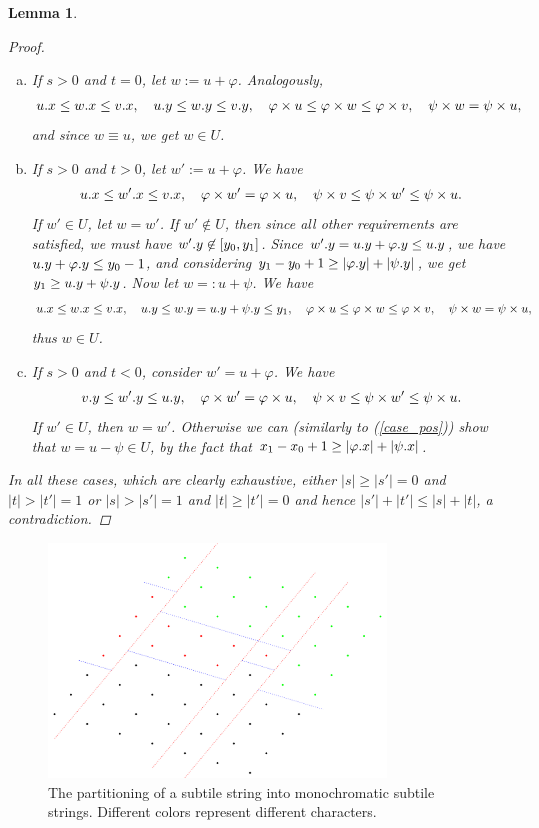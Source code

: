\documentclass[11pt, letterpaper]{article}
\theoremstyle{plain}
\newtheorem{lemma}{Lemma}
\theoremstyle{definition}
\theoremstyle{remark}
\renewcommand{\phi}{\varphi}
\newcommand{\eq}[1]{\begin{align*} #1 \end{align*}}
\begin{document}
\begin{lemma}
\begin{proof}
\begin{enumerate}[(a)]
			\item If $s > 0$ and $t = 0$, let $w := u + \phi$. Analogously, 
				\eq{
					\x{u} \le \x{w} \le \x{v}, \quad \y{u} \le \y{w} \le \y{v}, \quad \h{u} \le \h{w} \le \h{v}, \quad \s{w} = \s{u},
				}
				and since $w \equiv u$, we get $w \in U$. 
			
			\item If $s > 0$ and $t > 0$, let $w' := u + \phi$. \label{case_pos}
				We have \eq{
					\x{u} \le \x{w'} \le \x{v}, \quad \h{w'} = \h{u}, \quad \s{v} \le \s{w'} \le \s{u}.
				}
				If $w' \in U$, let $w = w'$.
				If $w' \not \in U$, then since all other requirements are satisfied, we must have $w'.y \not \in [y_0, y_1]$.
				Since $\y{w'} = \y{u} + \y{\phi} \le \y{u}$, we have $\y{u} + \y{\phi} \le y_0 - 1$, and
				considering $y_1 - y_0 + 1 \ge |\y{\phi}| + |\y{\psi}|$, we get $y_1 \ge u.y + \psi.y$.
				Now let $w =: u + \psi$.
				We have \eq{
					\x{u} \le \x{w} \le \x{v}, \quad \y{u} \le \y{w} = \y{u} + \y{\psi} \le y_1, \quad \h{u} \le \h{w} \le \h{v}, \quad \s{w} = \s{u},
				}
				thus $w \in U$.
			\item If $s > 0$ and $t < 0$, consider $w' = u + \phi$.
				We have \eq{
					\y{v} \le \y{w'} \le \y{u}, \quad \h{w'} = \h{u}, \quad \s{v} \le \s{w'} \le \s{u}.
				}
				If $w' \in U$, then $w = w'$.
				Otherwise we can (similarly to (\ref{case_pos})) show that $w = u - \psi \in U$, by the fact that $x_1 - x_0 + 1 \ge |\x{\phi}| + |\x{\psi}|$. 
		\end{enumerate}
		In all these cases, which are clearly exhaustive, either $|s| \ge |s'| = 0$ and $|t| > |t'| = 1$ or $|s| > |s'| = 1$ and $|t| \ge |t'| = 0$ and hence $|s'|+|t'| \le |s|+|t|$, a contradiction. 
	\end{proof}
\end{lemma}


\begin{figure}[!t]
	\begin{center}
		\includegraphics[width=0.8\textwidth]{drawings/parquet_decomposition}
	\end{center}
	\caption{The partitioning of a subtile string into monochromatic subtile strings. Different colors represent different characters.}
	\label{figure:tile_decomposition}
\end{figure}
\end{document}
